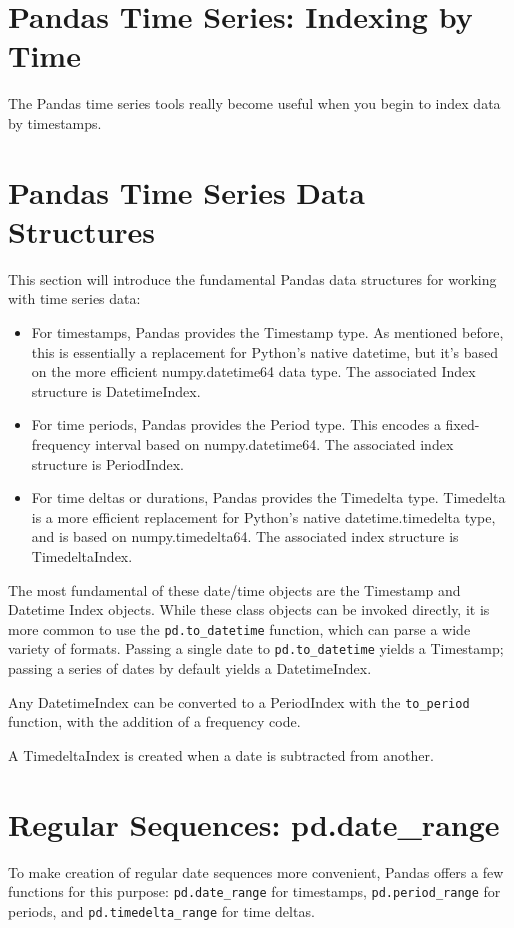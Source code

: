 \section{Pandas Time Series: Indexing by Time}
The Pandas time series tools really become useful when you begin to index data by
timestamps.

\section{Pandas Time Series Data Structures}
This section will introduce the fundamental Pandas data structures for working with
time series data:
\begin{itemize}
    \item For timestamps, Pandas provides the Timestamp type. As mentioned before, this
          is essentially a replacement for Python's native datetime, but it's based on the
          more efficient numpy.datetime64 data type. The associated Index structure is
          DatetimeIndex.
    \item For time periods, Pandas provides the Period type. This encodes a fixed-
          frequency interval based on numpy.datetime64. The associated index structure is
          PeriodIndex.
    \item For time deltas or durations, Pandas provides the Timedelta type. Timedelta is a
          more efficient replacement for Python's native datetime.timedelta type, and is
          based on numpy.timedelta64. The associated index structure is TimedeltaIndex.
\end{itemize}

The most fundamental of these date/time objects are the Timestamp and Datetime
Index objects. While these class objects can be invoked directly, it is more common to
use the \verb|pd.to_datetime| function, which can parse a wide variety of formats. Passing
a single date to \verb|pd.to_datetime| yields a Timestamp; passing a series of dates by
default yields a DatetimeIndex.

Any DatetimeIndex can be converted to a PeriodIndex with the \verb|to_period| function,
with the addition of a frequency code.

A TimedeltaIndex is created when a date is subtracted from another.

\section{Regular Sequences: pd.date\_range}
To make creation of regular date sequences more convenient, Pandas offers a few
functions for this purpose: \verb|pd.date_range| for timestamps, \verb|pd.period_range| for
periods, and \verb|pd.timedelta_range| for time deltas.

